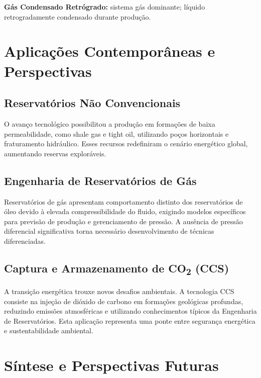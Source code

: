\documentclass[12pt,a4paper,oneside,brazilian,sumario=tradicional]{abntex2}
\begin{document}
\textbf{Gás Condensado Retrógrado:} sistema gás dominante; líquido retrogradamente condensado durante produção.

\chapter{Aplicações Contemporâneas e Perspectivas}

\section{Reservatórios Não Convencionais}

O avanço tecnológico possibilitou a produção em formações de baixa permeabilidade, como shale gas e tight oil, utilizando poços horizontais e fraturamento hidráulico. Esses recursos redefiniram o cenário energético global, aumentando reservas exploráveis.

\section{Engenharia de Reservatórios de Gás}

Reservatórios de gás apresentam comportamento distinto dos reservatórios de óleo devido à elevada compressibilidade do fluido, exigindo modelos específicos para previsão de produção e gerenciamento de pressão. A ausência de pressão diferencial significativa torna necessário desenvolvimento de técnicas diferenciadas.

\section{Captura e Armazenamento de CO\textsubscript{2} (CCS)}

A transição energética trouxe novos desafios ambientais. A tecnologia CCS consiste na injeção de dióxido de carbono em formações geológicas profundas, reduzindo emissões atmosféricas e utilizando conhecimentos típicos da Engenharia de Reservatórios. Esta aplicação representa uma ponte entre segurança energética e sustentabilidade ambiental.

\chapter{Síntese e Perspectivas Futuras}
\end{document}
